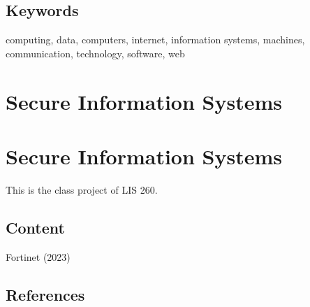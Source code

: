 \documentclass[
  letterpaper,
  DIV=11,
  numbers=noendperiod]{scrreprt}
\begin{document}
\section{Keywords}\label{keywords}

computing, data, computers, internet, information systems, machines,
communication, technology, software, web


\chapter{Secure Information Systems}\label{secure-information-systems}


\chapter{Secure Information Systems}\label{secure-information-systems-1}

This is the class project of LIS 260.

\section{Content}\label{content}

Fortinet (2023)

\section{References}\label{references-1}
\end{document}
